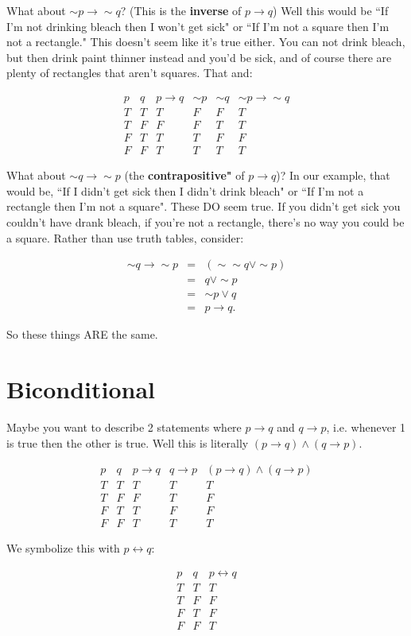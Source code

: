 \documentclass[10pt]{article}
\theoremstyle{definition}
\begin{document}
What about $\sim p \to \sim q$? (This is the {\bf inverse} of $p\to q$)  Well this would be ``If I'm not drinking bleach then I won't get sick" or ``If I'm not a square then I'm not a rectangle."  This doesn't seem like it's true either.  You can not drink bleach, but then drink paint thinner instead and you'd be sick, and of course there are plenty of rectangles that aren't squares.  That and:

$$\begin{array}{c|c|c|c|c|c}
p & q & p\to q &\sim p & \sim q& \sim p\to \sim q\\
\hline
T & T & T & F & F & T\\
T & F & F & F & T &T\\
F & T & T & T & F & F \\
F & F & T & T & T & T
\end{array}$$


What about $\sim q \to \sim p$ (the {\bf contrapositive"} of $p\to q$)?  In our example, that would be, ``If I didn't get sick then I didn't drink bleach" or ``If I'm not a rectangle then I'm not a square".  These DO seem true.  If you didn't get sick you couldn't have drank bleach, if you're not a rectangle, there's no way you could be a square.  Rather than use truth tables, consider:

\begin{eqnarray*}
\sim q \to \sim p&=&(\sim \sim q \vee \sim p)\\
&=&q \vee \sim p\\
&=&\sim p \vee q\\
&=&p\to q.
\end{eqnarray*}

So these things ARE the same.


\section{Biconditional}

Maybe you want to describe 2 statements where $p\to q$ and $q\to p$, i.e. whenever 1 is true then the other is true.  Well this is literally $(p\to q)\wedge (q\to p)$.



$$\begin{array}{c|c|c|c|c}
p & q & p\to q & q\to p& (p\to q)\wedge (q\to p)\\
\hline
T & T & T & T&T\\
T & F & F & T&F\\
F & T & T & F &F\\
F & F & T & T&T
\end{array}$$



We symbolize this with $p\leftrightarrow q:$



$$\begin{array}{c|c|c}
p & q & p\leftrightarrow q \\
\hline
T & T & T \\
T & F & F\\
F & T & F \\
F & F & T 
\end{array}$$
\end{document}
